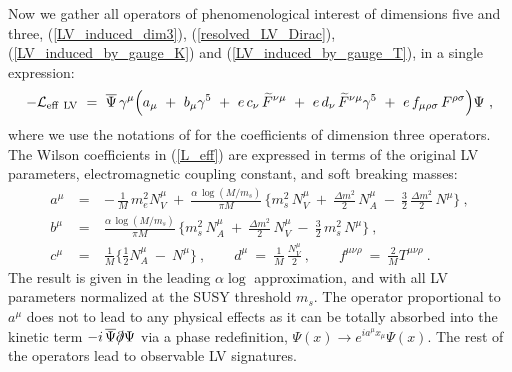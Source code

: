 \documentclass[12pt]{revtex4}
\newcommand{\slashed}[1]{\hbox{{$#1$}\llap{$/$}}}
\begin{document}
Now we gather all operators of phenomenological
interest of dimensions five and three, 
(\ref{LV_induced_dim3}), (\ref{resolved_LV_Dirac}),
(\ref{LV_induced_by_gauge_K}) and
(\ref{LV_induced_by_gauge_T}), in a single expression:
\begin{equation}
\label{L_eff}
 - \mathcal{L}_{\rm eff~LV}
         ~=~ 
\overline{\Psi}\, \gamma^\mu \Big( 
 a_\mu ~+~ b_\mu \gamma^5 
~+~ e\,c_\nu\,   \widetilde{F}^{\nu\mu} 
~+~  e\, d_\nu\,\widetilde{F}^{\nu\mu} \gamma^5
~+~e\, f_{\mu\rho\sigma}\,  F^{\rho\sigma} 
\Big) \Psi~, 
\end{equation} 
%
where we use the notations of \cite{Colladay:1998fq} for the
coefficients of dimension three operators. The Wilson coefficients in
(\ref{L_eff}) are expressed in terms of the original LV parameters,
electromagnetic coupling constant, and soft breaking masses: 
\begin{eqnarray}
\nonumber
        a^\mu & ~=~ &
         -\, \frac{1}{M}\, m_e^2 N_V^\mu 
        ~+~
        \frac{\alpha\, \log (M/m_s)}{\pi M}\, 
        \Big\{
         m_s^2\, N_V^\mu 
                ~+~
                 \frac{\Delta m^2}{2}\, 
                                             N_A^\mu
                ~-~
                \frac{3}{2}\, \frac{\Delta m^2}{2}\, 
                                               N^\mu  
        \Big\}~ ,
\\
\label{L_eff_coefs}
        b^\mu & ~=~ & 
        \frac{\alpha\,\log (M/m_s)}{\pi M} \, 
        \Big\{
                 m_s^2\, N_A^\mu
                ~+~
                 \frac{\Delta m^2}{2}\, 
                                             N_V^\mu
                ~-~
                \frac{3}{2}\, m_s^2\, N^\mu
        \Big\} ~,
\\
\nonumber
        c^\mu & ~=~ &
         \frac{1}{M}
        \Big\{ 
                \frac{1}{2}N_A^\mu
                ~-~
                N^\mu
        \Big\}~,\qquad 
        d^\mu ~=~
        \frac{1}{M}\, \frac{N_V^\mu}{2} 
~,\qquad 
        f^{\mu\nu\rho} ~ = ~
        \frac{2}{M} T^{\mu\nu\rho}
~.
\end{eqnarray}
%
The result is given in the leading $\alpha \log$ approximation, and with
all LV parameters normalized at the SUSY threshold
$m_s$. The operator proportional to $ a^\mu $ does not to lead to 
any physical effects as it can be totally absorbed into
the kinetic term $ - i\, \overline{\Psi}\slashed{\partial}\Psi $
via a phase redefinition, $ \Psi(x) \to e^{i a^\mu x_\mu} \Psi(x) $.
The rest of the operators lead to observable LV signatures. 
\end{document}
